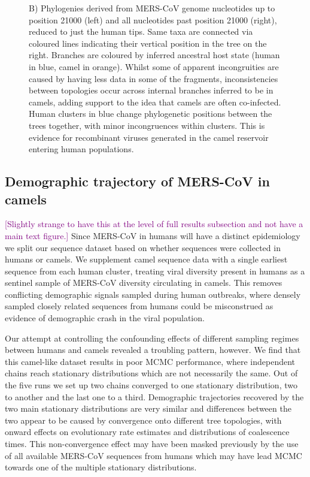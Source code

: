 \documentclass[11pt,oneside,letterpaper]{article}
\def\tbc#1{\textcolor{purple}{[#1]}}
\def\lmc#1{\textcolor{green}{[#1]}}
\begin{document}
\begin{figure}
{    B) Phylogenies derived from MERS-CoV genome nucleotides up to position 21000 (left) and all nucleotides past position 21000 (right), reduced to just the human tips.
  	Same taxa are connected via coloured lines indicating their vertical position in the tree on the right.
  	Branches are coloured by inferred ancestral host state (human in blue, camel in orange).
  	Whilst some of apparent incongruities are caused by having less data in some of the fragments, inconsistencies between topologies occur across internal branches inferred to be in camels, adding support to the idea that camels are often co-infected.%
  	Human clusters in blue change phylogenetic positions between the trees %
    together, with minor incongruences within clusters.
  	This is evidence for recombinant viruses generated in the camel reservoir%
    entering human populations.
    }%
    \label{recombination}%
\end{figure}

\subsection*{Demographic trajectory of MERS-CoV in camels}

\tbc{Slightly strange to have this at the level of full results subsection and not have a main text figure.}
Since MERS-CoV in humans will have a distinct epidemiology
we split our sequence dataset based on whether sequences were collected in humans or camels.
We supplement camel sequence data with a single earliest sequence from each human cluster, treating viral diversity present in humans as a sentinel sample of MERS-CoV diversity circulating in camels.
This removes conflicting demographic signals sampled during human outbreaks, where densely sampled closely related sequences from humans could be misconstrued as evidence of demographic crash in the viral population.

Our attempt at controlling the confounding effects of different sampling regimes between humans and camels revealed a troubling pattern, however.
We find that this camel-like dataset results in poor MCMC performance, where independent chains reach stationary distributions which are not necessarily the same.
Out of the five runs we set up two chains converged to one stationary distribution, two to another and the last one to a third.
Demographic trajectories recovered by the two main stationary distributions are very similar and differences between the two appear to be caused by convergence onto different tree topologies, with onward effects on evolutionary rate estimates and distributions of coalescence times.
This non-convergence effect may have been masked previously by the use of all available MERS-CoV sequences from humans which may have lead MCMC towards one of the multiple stationary distributions.
\end{document}
